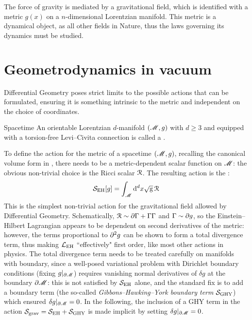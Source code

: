 
The force of gravity is mediated by a gravitational field, which is identified with a metric $ g(x) $ on a $ n $-dimensional Lorentzian manifold. This metric is a dynamical object, as all other fields in Nature, thus the laws governing its dynamics must be studied.

\section{Geometrodynamics in vacuum}

Differential Geometry poses strict limits to the possible actions that can be formulated, ensuring it is something intrinsic to the metric and independent on the choice of coordinates.

\begin{definition}{Spacetime}{}
  An orientable Lorentzian $ d $-manifold $ (\mathscr{M} , g) $ with $ d \geq 3 $ and equipped with a torsion-free Levi--Civita connection is called a .
\end{definition}

To define the action for the metric of a spacetime $ (\mathscr{M} , g) $, recalling the canonical volume form in , there needs to be a metric-dependent scalar function on $ \mathscr{M} $: the obvious non-trivial choice is the Ricci scalar $ \EuScript{R} $. The resulting action is the :
\begin{equation}
  \mathcal{S}_\text{EH}[g] = \int_\mathscr{M} \mathrm{d}^d x \sqrt{\mathrm{g}} \, \EuScript{R}
  \label{eq:einstein-hilbert-action}
\end{equation}
This is the simplest non-trivial action for the gravitational field allowed by Differential Geometry.
Schematically, $ \EuScript{R} \sim \partial \Gamma + \Gamma \Gamma $ and $ \Gamma \sim \partial g $, so the Einstein--Hilbert Lagrangian appears to be dependent on second derivatives of the metric: however, the terms proportional to $ \partial^2 g $ can be shown to form a total divergence term, thus making $ \mathcal{L}_\text{EH} $ ``effectively" first order, like most other actions in physics. The total divergence term needs to be treated carefully on manifolds with boundary, since a well-posed variational problem with Dirichlet boundary conditions (fixing $ g \vert_{\partial \mathscr{M}} $) requires vanishing normal derivatives of $ \delta g $ at the boundary $ \partial \mathscr{M} $: this is not satisfied by $ \mathcal{S}_\text{EH} $ alone, and the standard fix is to add a boundary term (the so-called \emph{Gibbons--Hawking--York boundary term} $ \mathcal{S}_\text{GHY} $) which ensured $ \delta g \vert_{\partial \mathscr{M}} = 0 $. In the following, the inclusion of a GHY term in the action $ \mathcal{S}_\text{grav} = \mathcal{S}_\text{EH} + \mathcal{S}_\text{GHY} $ is made implicit by setting $ \delta g \vert_{\partial \mathscr{M}} = 0 $.

